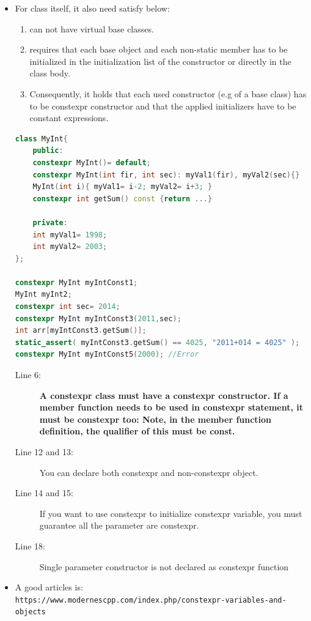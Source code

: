 \documentclass[a4paper,11pt,twoside]{book}
\begin{document}
\begin{itemize}
	\item For class itself, it also need satisfy below:
	\begin{enumerate}
		\item can not have virtual base classes.
		\item requires that each base object and each non-static member has to be initialized in the initialization list of the constructor or directly in the class body. 
		\item Consequently, it holds that each used constructor (e.g of a base class) has to be constexpr constructor and that the applied initializers have to be constant expressions.
	\end{enumerate}
	
\begin{lstlisting}[frame=single, language=c++]
class MyInt{
	public:
	constexpr MyInt()= default;
	constexpr MyInt(int fir, int sec): myVal1(fir), myVal2(sec){}
	MyInt(int i){ myVal1= i-2; myVal2= i+3; }
    constexpr int getSum() const {return ...}
	
	private:
	int myVal1= 1998;
	int myVal2= 2003;
};

constexpr MyInt myIntConst1;
MyInt myInt2;
constexpr int sec= 2014;
constexpr MyInt myIntConst3(2011,sec);
int arr[myIntConst3.getSum()];
static_assert( myIntConst3.getSum() == 4025, "2011+014 = 4025" );
constexpr MyInt myIntConst5(2000); //Error
\end{lstlisting}
	\begin{description}

        \item[Line 6:] \textbf{A constexpr class must have a constexpr constructor. If a member function needs to be used in constexpr statement, it must be constexpr too: Note, in the member function definition, the qualifier of this must be const.}

		\item[Line 12 and 13:] You can declare both constexpr and non-constexpr object.
		
		\item[Line 14 and 15:] If you want to use constexpr to initialize constexpr variable, you must guarantee all the parameter are constexpr.
		
		\item[Line 18:] Single parameter constructor is not declared as constexpr function
	\end{description}

	\item A good articles is: \\ \verb|https://www.modernescpp.com/index.php/constexpr-variables-and-objects|
\end{itemize}
\end{document}
